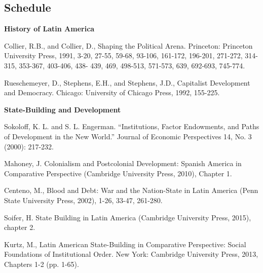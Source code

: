 \documentclass[letterpaper]{article}
\renewenvironment{itemize}{
  \begin{list}{}{
    \setlength{\leftmargin}{1.5em}
  }
}{
  \end{list}
}
\begin{document}
\subsection*{Schedule}

\begin{enumerate}

\item {\bf History of Latin America}
	\begin{itemize}
		\item[$\bullet$] Collier, R.B., and Collier, D., Shaping the Political Arena. Princeton: Princeton University Press, 1991, 3-20, 27-55, 59-68, 93-106, 161-172, 196-201, 271-272, 314-315, 353-367, 403-406, 438- 439, 469, 498-513, 571-573, 639, 692-693, 745-774.
		\item[$\bullet$] Rueschemeyer, D., Stephens, E.H., and Stephens, J.D., Capitalist Development and Democracy. Chicago: University of Chicago Press, 1992, 155-225.
	\end{itemize}



\item {\bf State-Building and Development}
	\begin{itemize}
		\item[$\bullet$] Sokoloff, K. L. and S. L. Engerman. ``Institutions, Factor Endowments, and Paths of Development in the New World.'' Journal of Economic Perspectives 14, No. 3 (2000): 217-232.
		\item[$\bullet$] Mahoney, J. Colonialism and Postcolonial Development: Spanish America in Comparative Perspective (Cambridge University Press, 2010), Chapter 1.
		\item[$\bullet$] Centeno, M., Blood and Debt: War and the Nation-State in Latin America (Penn State University Press, 2002), 1-26, 33-47, 261-280.
		\item[$\bullet$] Soifer, H. State Building in Latin America (Cambridge University Press, 2015), chapter 2.
		\item[$\bullet$] Kurtz, M., Latin American State-Building in Comparative Perspective: Social Foundations of Institutional Order. New York: Cambridge University Press, 2013, Chapters 1-2 (pp. 1-65).
	\end{itemize}



\end{enumerate}
\end{document}
